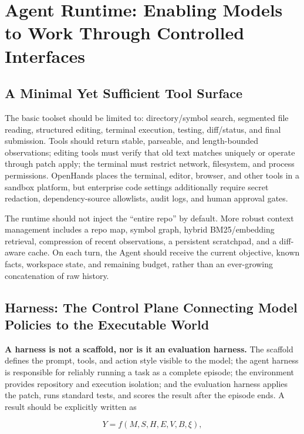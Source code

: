 \documentclass[10pt,a4paper,UTF8,fontset=none]{ctexart}
\begin{document}
\section{Agent Runtime: Enabling Models to Work Through Controlled Interfaces}

\subsection{A Minimal Yet Sufficient Tool Surface}

The basic toolset should be limited to: directory/symbol search, segmented file reading, structured editing, terminal execution, testing, diff/status, and final submission. Tools should return stable, parseable, and length-bounded observations; editing tools must verify that old text matches uniquely or operate through patch apply; the terminal must restrict network, filesystem, and process permissions. OpenHands places the terminal, editor, browser, and other tools in a sandbox platform\cite{en:wang2024openhands}, but enterprise code settings additionally require secret redaction, dependency-source allowlists, audit logs, and human approval gates.

The runtime should not inject the ``entire repo'' by default. More robust context management includes a repo map, symbol graph, hybrid BM25/embedding retrieval, compression of recent observations, a persistent scratchpad, and a diff-aware cache. On each turn, the Agent should receive the current objective, known facts, workspace state, and remaining budget, rather than an ever-growing concatenation of raw history.

\subsection{Harness: The Control Plane Connecting Model Policies to the Executable World}

\textbf{A harness is not a scaffold, nor is it an evaluation harness.} The scaffold defines the prompt, tools, and action style visible to the model; the agent harness is responsible for reliably running a task as a complete episode; the environment provides repository and execution isolation; and the evaluation harness applies the patch, runs standard tests, and scores the result after the episode ends. A result should be explicitly written as

\begin{equation}
Y=f(M,S,H,E,V,B,\xi),
\label{en:eq:harness-factorization}
\end{equation}
\end{document}

